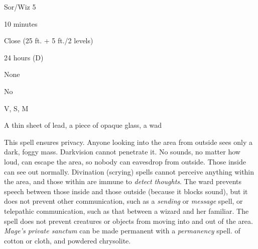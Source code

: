
\begin{description*}
\item[Level:] Sor/Wiz 5
\item[Casting Time:] 10 minutes
\item[Range:] Close (25 ft. + 5 ft./2 levels)
\item[Duration:] 24 hours (D)
\item[Saving Throw:] None
\item[Spell Resistance:] No
\item[Components:] V, S, M
\item[Arcane Material Component:] A thin sheet of lead, a piece of opaque glass, a wad
\end{description*}

This spell ensures privacy. Anyone looking into the area from outside sees only
a dark, foggy mass. Darkvision cannot penetrate it. No sounds, no matter how loud,
can escape the area, so nobody can eavesdrop from outside. Those inside can see
out normally.
Divination (scrying) spells cannot perceive anything within the area, and those
within are immune to \textit{detect thoughts}. The ward prevents speech between
those inside and those outside (because it blocks sound), but it does not prevent
other communication, such as a \textit{sending} or \textit{message} spell, or telepathic
communication, such as that between a wizard and her familiar.
The spell does not prevent creatures or objects from moving into and out of the
area.
\textit{Mage's private sanctum} can be made permanent with a \textit{permanency
}spell.
of cotton or cloth, and powdered chrysolite.